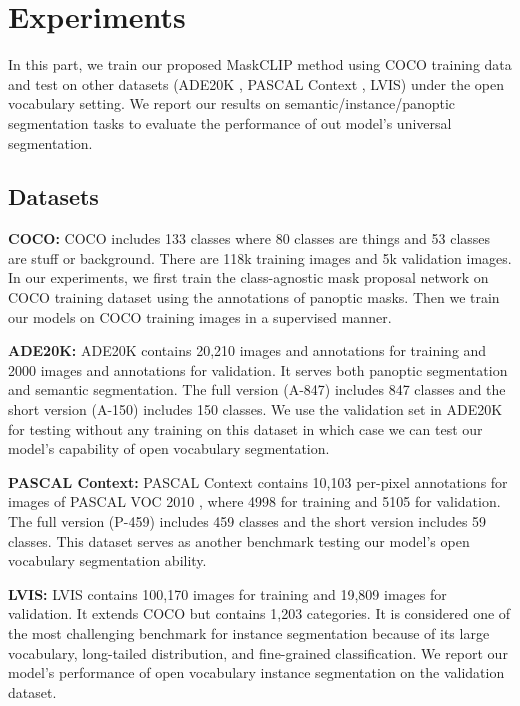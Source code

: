 \documentclass{article}
\theoremstyle{plain}
\theoremstyle{definition}
\theoremstyle{remark}
\begin{document}
\section{Experiments}

In this part, we train our proposed MaskCLIP method using COCO  \citep{lin2014microsoft} training data and test on other datasets (ADE20K  \citep{zhou2016semantic, zhou2017scene}, PASCAL Context  \citep{mottaghi_cvpr14}, LVIS) under the open vocabulary setting. We report our results on semantic/instance/panoptic segmentation tasks to evaluate the performance of out model's universal segmentation.
\subsection{Datasets}

\textbf{COCO:} COCO \citep{lin2014microsoft} includes 133 classes where 80 classes are things and 53 classes are stuff or background. There are 118k training images and 5k validation images. In our experiments, we first train the class-agnostic mask proposal network on COCO training dataset using the annotations of panoptic masks. Then we train our models on COCO training images in a supervised manner.

\textbf{ADE20K:} ADE20K  \citep{zhou2016semantic, zhou2017scene} contains 20,210 images and annotations for training and 2000 images and annotations for validation. It serves both panoptic segmentation and semantic segmentation. The full version (A-847)  \citep{zhou2016semantic} includes 847 classes and the short version (A-150)  \citep{zhou2017scene} includes 150 classes. We use the validation set in ADE20K for testing without any training on this dataset in which case we can test our model's capability of open vocabulary segmentation. 

\textbf{PASCAL Context:} PASCAL Context  \citep{mottaghi_cvpr14} contains 10,103 per-pixel annotations for images of PASCAL VOC 2010  \citep{pascal-voc-2010}, where 4998 for training and 5105 for validation. The full version (P-459) includes 459 classes and the short version includes 59 classes. This dataset serves as another benchmark testing our model's open vocabulary segmentation ability.

\textbf{LVIS:} LVIS \citep{gupta2019lvis} contains 100,170 images for training and 19,809 images for validation. It extends COCO \citep{lin2014microsoft} but contains 1,203 categories. It is considered one of the most challenging benchmark for instance segmentation because of its large vocabulary, long-tailed distribution, and fine-grained classification. We report our model's performance of open vocabulary instance segmentation on the validation dataset. 
\end{document}
